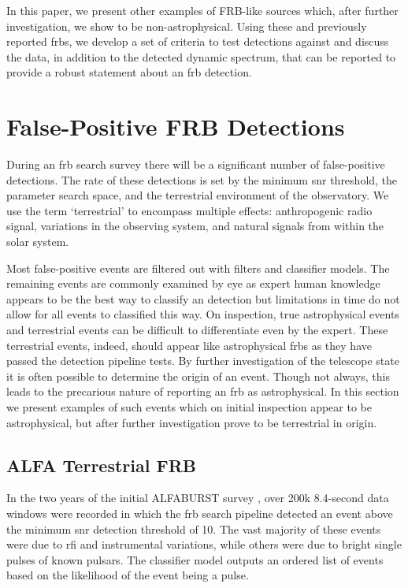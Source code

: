 \documentclass[a4paper,fleqn,usenatbib]{mnras}
\begin{document}
In this paper, we present other examples of FRB-like sources which, after
further investigation, we show to be non-astrophysical. Using these and
previously reported \glspl{frb}, we develop a set of criteria to test detections
against and discuss the data, in addition to the detected dynamic spectrum, that
can be reported to provide a robust statement about an \gls{frb} detection.

\section{False-Positive FRB Detections}
\label{sec:false-pos}

During an \gls{frb} search survey there will be a significant number of
false-positive detections. The rate of these detections is set by the minimum
\gls{snr} threshold, the parameter search space, and the terrestrial environment
of the observatory. We use the term `terrestrial' to encompass multiple effects:
anthropogenic radio signal, variations in the observing system, and natural
signals from within the solar system.

Most false-positive events are filtered out with filters and classifier models.
The remaining events are commonly examined by eye as expert human knowledge
appears to be the best way to classify an detection but limitations in time do
not allow for all events to classified this way. On inspection, true
astrophysical events and terrestrial events can be difficult to differentiate
even by the expert.  These terrestrial events, indeed, should appear like
astrophysical \glspl{frb} as they have passed the detection pipeline tests. By
further investigation of the telescope state it is often possible to determine
the origin of an event. Though not always, this leads to the precarious nature
of reporting an \gls{frb} as astrophysical.  In this section we present examples
of such events which on initial inspection appear to be astrophysical, but after
further investigation prove to be terrestrial in origin.

\subsection{ALFA Terrestrial FRB}
\label{sec:D20161204}

In the two years of the initial ALFABURST survey \citep{2017ApJS..228...21C,
2018MNRAS.474.3847F}, over 200k 8.4-second data windows were recorded in which
the \gls{frb} search pipeline detected an event above the minimum \gls{snr}
detection threshold of 10.  The vast majority of these events were due to
\gls{rfi} and instrumental variations, while others were due to bright single
pulses of known pulsars.  The classifier model outputs an ordered list of events
based on the likelihood of the event being a pulse.
\end{document}
